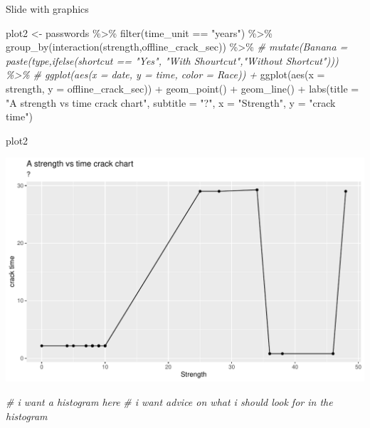 \documentclass[10pt,ignorenonframetext,aspectratio=169]{beamer}
\newenvironment{Shaded}{\begin{snugshade}}{\end{snugshade}}
\newcommand{\AttributeTok}[1]{\textcolor[rgb]{0.77,0.63,0.00}{#1}}
\newcommand{\CommentTok}[1]{\textcolor[rgb]{0.56,0.35,0.01}{\textit{#1}}}
\newcommand{\FunctionTok}[1]{\textcolor[rgb]{0.00,0.00,0.00}{#1}}
\newcommand{\NormalTok}[1]{#1}
\newcommand{\OtherTok}[1]{\textcolor[rgb]{0.56,0.35,0.01}{#1}}
\newcommand{\SpecialCharTok}[1]{\textcolor[rgb]{0.00,0.00,0.00}{#1}}
\newcommand{\StringTok}[1]{\textcolor[rgb]{0.31,0.60,0.02}{#1}}
\renewenvironment{Shaded}{\color{black}\begin{snugshade}\color{black}}{\end{snugshade}}
\begin{document}
\begin{frame}[fragile]{Slide with graphics}
\protect\hypertarget{slide-with-graphics}{}
\begin{Shaded}
\begin{Highlighting}[]
\NormalTok{plot2 }\OtherTok{\textless{}{-}}\NormalTok{ passwords }\SpecialCharTok{\%\textgreater{}\%}
    \FunctionTok{filter}\NormalTok{(time\_unit }\SpecialCharTok{==} \StringTok{"years"}\NormalTok{) }\SpecialCharTok{\%\textgreater{}\%}
    \FunctionTok{group\_by}\NormalTok{(}\FunctionTok{interaction}\NormalTok{(strength,offline\_crack\_sec)) }\SpecialCharTok{\%\textgreater{}\%}
    \CommentTok{\# mutate(Banana = paste(type,ifelse(shortcut == "Yes", "With Shourtcut","Without Shortcut"))) \%\textgreater{}\%}
    \CommentTok{\# ggplot(aes(x = date, y = time, color = Race)) +}
    \FunctionTok{ggplot}\NormalTok{(}\FunctionTok{aes}\NormalTok{(}\AttributeTok{x =}\NormalTok{ strength, }\AttributeTok{y =}\NormalTok{ offline\_crack\_sec)) }\SpecialCharTok{+}
    \FunctionTok{geom\_point}\NormalTok{() }\SpecialCharTok{+}
    \FunctionTok{geom\_line}\NormalTok{() }\SpecialCharTok{+}
    \FunctionTok{labs}\NormalTok{(}\AttributeTok{title =} \StringTok{"A strength vs time crack chart"}\NormalTok{, }\AttributeTok{subtitle =} \StringTok{"?"}\NormalTok{, }\AttributeTok{x =} \StringTok{"Strength"}\NormalTok{, }\AttributeTok{y =} \StringTok{"crack time"}\NormalTok{)}

\NormalTok{plot2}
\end{Highlighting}
\end{Shaded}

\begin{center}\includegraphics{Untitled_files/figure-beamer/plot2-1} \end{center}

\begin{Shaded}
\begin{Highlighting}[]
\CommentTok{\# i want a histogram here}
\CommentTok{\# i want advice on what i should look for in the histogram}
\end{Highlighting}
\end{Shaded}
\end{frame}
\end{document}
